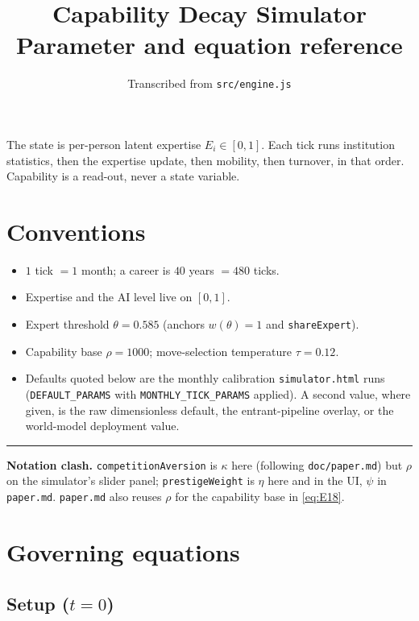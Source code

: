\documentclass[11pt]{article}
\title{Capability Decay Simulator\\[4pt]
       {\large Parameter and equation reference}}
\author{}
\date{\small Transcribed from \texttt{src/engine.js}}
\newcommand{\key}[1]{\texttt{\footnotesize #1}}
\newcommand{\eqn}[1]{\eqref{eq:#1}}
\begin{document}
\maketitle
\vspace{-2.5em}

\noindent
The state is per-person latent expertise $E_i \in [0,1]$. Each tick runs
institution statistics, then the expertise update, then mobility, then turnover,
in that order. Capability is a read-out, never a state variable.

\section*{Conventions}
\begin{itemize}[leftmargin=1.4em,itemsep=1pt,topsep=3pt]
  \item $1$ tick $=1$ month; a career is $40$ years $=480$ ticks.
  \item Expertise and the AI level live on $[0,1]$.
  \item Expert threshold $\theta = 0.585$ (anchors $w(\theta)=1$ and \key{shareExpert}).
  \item Capability base $\rho = 1000$; move-selection temperature $\tau = 0.12$.
  \item Defaults quoted below are the monthly calibration \key{simulator.html}
        runs (\key{DEFAULT\_PARAMS} with \key{MONTHLY\_TICK\_PARAMS} applied). A
        second value, where given, is the raw dimensionless default, the
        entrant-pipeline overlay, or the world-model deployment value.
\end{itemize}

\bigskip
\hrule
\medskip
\noindent\textbf{Notation clash.}
\key{competitionAversion} is $\kappa$ here (following \texttt{doc/paper.md}) but
$\rho$ on the simulator's slider panel; \key{prestigeWeight} is $\eta$ here and in
the UI, $\psi$ in \texttt{paper.md}. \texttt{paper.md} also reuses $\rho$ for the
capability base in \eqn{E18}.

\section{Governing equations}

\subsection*{Setup ($t = 0$)}
\end{document}
